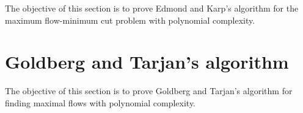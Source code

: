 The objective of this section is to prove Edmond and Karp's algorithm
for the maximum flow-minimum cut problem with polynomial
complexity.



\section{Goldberg and Tarjan's algorithm}

The objective of this section is to prove Goldberg and Tarjan's
algorithm for finding maximal flows with polynomial complexity.

